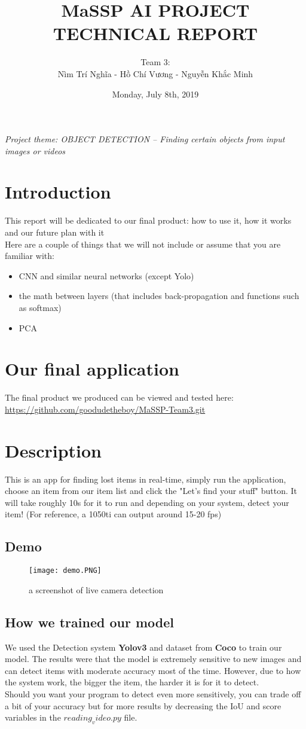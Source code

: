\documentclass{article}
\title{\textbf{MaSSP AI PROJECT TECHNICAL REPORT}}
\author{Team 3:\\
Nìm Trí Nghĩa - Hồ Chí Vương - Nguyễn Khắc Minh}
\date{Monday, July 8th, 2019}
\begin{document}
\maketitle
\textit{Project theme: OBJECT DETECTION – Finding certain objects from input images or videos} 
\graphicspath{ {./images/} }

\section{Introduction}
This report will be dedicated to our final product: how to use it, how it works and our future plan with it\\
Here are a couple of things that we will not include or assume that you are familiar with:
\begin{itemize}
	\item CNN and similar neural networks (except Yolo)
	\item the math between layers (that includes back-propagation and functions such as softmax)
	\item PCA
	
\end{itemize}


\section{Our final application}
The final product we produced can be viewed and tested here: \url{https://github.com/goodudetheboy/MaSSP-Team3.git}

\section{Description}
This is an app for finding lost items in real-time, simply run the application, choose an item from our item list and click the "Let's find your stuff" button. It will take roughly 10s for it to run and depending on your system, detect your item! (For reference, a 1050ti can output around 15-20 fps)

\newpage
\subsection{Demo}
\begin{figure}[h!]
	\texttt{[image: demo.PNG]}
	\caption*{a screenshot of live camera detection}
\end{figure}


\subsection{How we trained our model}
We used the Detection system \textbf{Yolov3} and dataset from \textbf{Coco} to train our model. The results were that the model is extremely sensitive to new images and can detect items with moderate accuracy most of the time. However, due to how the system work, the bigger the item, the harder it is for it to detect.\\
Should you want your program to detect even more sensitively, you can trade off a bit of your accuracy but for more results by decreasing the IoU and score variables in the \textbf{$reading_video.py$} file.
\end{document}
